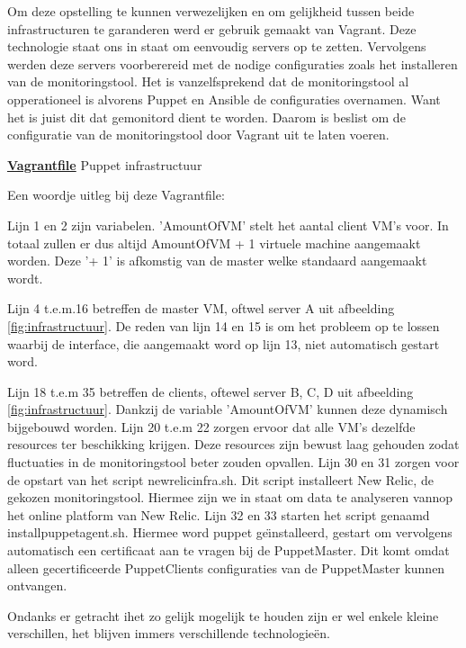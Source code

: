 Om deze opstelling te kunnen verwezelijken en om gelijkheid tussen beide infrastructuren te garanderen werd er gebruik gemaakt van Vagrant. Deze technologie staat ons in staat om eenvoudig servers op te zetten. Vervolgens werden deze servers voorberereid met de nodige configuraties zoals het installeren van de monitoringstool. Het is vanzelfsprekend dat de monitoringstool al opperationeel is alvorens Puppet en Ansible de configuraties overnamen. Want het is juist dit dat gemonitord dient te worden. Daarom is beslist om de configuratie van de monitoringstool door Vagrant uit te laten voeren.


\underline{\textbf{Vagrantfile}} Puppet infrastructuur


Een woordje uitleg bij deze Vagrantfile:

Lijn 1 en 2 zijn variabelen. 'AmountOfVM' stelt het aantal client VM's voor. In totaal zullen er dus altijd AmountOfVM + 1 virtuele machine aangemaakt worden. Deze '+ 1' is afkomstig van de master welke standaard aangemaakt wordt.

Lijn 4 t.e.m.16 betreffen de master VM, oftwel server A uit afbeelding  \ref{fig:infrastructuur}.
De reden van lijn 14 en 15 is om het probleem op te lossen waarbij de interface, die aangemaakt word op lijn 13, niet automatisch gestart word.

Lijn 18 t.e.m 35 betreffen de clients, oftewel server B, C, D uit afbeelding  \ref{fig:infrastructuur}. Dankzij de variable 'AmountOfVM' kunnen deze dynamisch bijgebouwd worden. 
Lijn 20 t.e.m 22 zorgen ervoor dat alle VM's dezelfde resources ter beschikking krijgen. Deze resources zijn bewust laag gehouden zodat fluctuaties in de monitoringstool beter zouden opvallen.
Lijn 30 en 31 zorgen voor de opstart van het script newrelicinfra.sh. Dit script installeert New Relic, de gekozen monitoringstool. Hiermee zijn we in staat om data  te analyseren vannop het online platform van New Relic.
Lijn 32 en 33 starten het script genaamd installpuppetagent.sh. Hiermee word puppet ge{\"\i}nstalleerd, gestart om vervolgens automatisch een certificaat aan te vragen bij de PuppetMaster. Dit komt omdat alleen gecertificeerde PuppetClients configuraties van de PuppetMaster kunnen ontvangen.

Ondanks er getracht ihet zo gelijk mogelijk te houden zijn er wel enkele kleine verschillen, het blijven immers verschillende technologie\"en.

